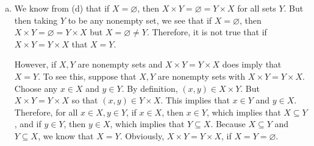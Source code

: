 \documentclass[11pt,letterpaper]{article}
\begin{document}
\begin{enumerate}[(a)]
\item We know from (d) that if $X= \varnothing$, then $X \times Y= \varnothing= Y \times X$ for all sets $Y$. But then taking $Y$ to be any nonempty set, we see that if $X= \varnothing$, then $X \times Y= \varnothing= Y \times X$ but $X= \varnothing \neq Y$. Therefore, it is not true that if $X \times Y= Y \times X$ that $X= Y$. \pspace

However, if $X, Y$ are nonempty sets and $X \times Y= Y \times X$ does imply that $X= Y$. To see this, suppose that $X, Y$ are nonempty sets with $X \times Y= Y \times X$. Choose any $x \in X$ and $y \in Y$. By definition, $(x, y) \in X \times Y$. But $X \times Y= Y \times X$ so that $(x, y) \in Y \times X$. This implies that $x \in Y$ and $y \in X$. Therefore, for all $x \in X, y \in Y$, if $x \in X$, then $x \in Y$, which implies that $X \subseteq Y$, and if $y \in Y$, then $y \in X$, which implies that $Y \subseteq X$. Because $X \subseteq Y$ and $Y \subseteq X$, we know that $X= Y$. Obviously, $X \times Y= Y \times X$, if $X= Y= \varnothing$. 
\end{enumerate}
\end{document}
